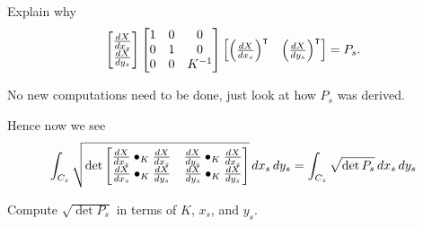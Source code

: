 \documentclass{ximera}
\begin{document}
\begin{problem}
  Explain why
  \[
\begin{bmatrix}
    \dd[X]{x_s}\\
    \dd[X]{y_s}
  \end{bmatrix}
  \begin{bmatrix}
    1 & 0 & 0\\
    0 & 1 & 0\\
    0 & 0 & K^{-1}
  \end{bmatrix}
  \begin{bmatrix}
    \left(\dd[X]{x_s}\right)^\transpose & \left(\dd[X]{y_s}\right)^\transpose
  \end{bmatrix} =P_s.
  \]
  \begin{hint}
    No new computations need to be done, just look at how $P_s$ was derived.
  \end{hint}
\end{problem}

Hence now we see 
\[
\int_{C_s} \sqrt{
  \det
  \begin{bmatrix}
    \dd[X]{x_s}\bullet_K \dd[X]{x_s} & \dd[X]{y_s}\bullet_K \dd[X]{x_s} \\
    \dd[X]{x_s}\bullet_K \dd[X]{y_s} & \dd[X]{y_s}\bullet_K \dd[X]{y_s}
  \end{bmatrix}
}\d x_s\d y_s = \int_{C_s} \sqrt{\det P_s}\d x_s\d y_s
\]

\begin{problem}
  Compute $\sqrt{\det P_s}$ in terms of $K$, $x_s$, and $y_s$.
\end{problem}
\end{document}
